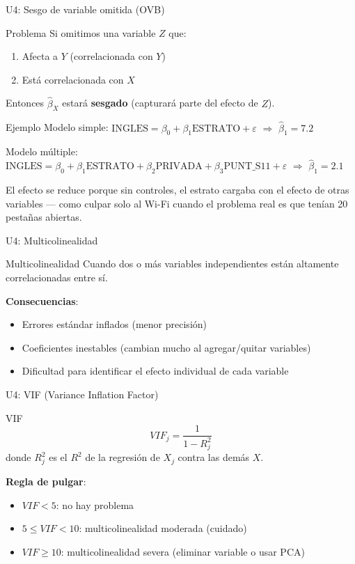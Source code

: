\documentclass[aspectratio=169, 11pt]{beamer}
\begin{document}
\begin{frame}{U4: Sesgo de variable omitida (OVB)}
\begin{alertblock}{Problema}
Si omitimos una variable $Z$ que:
\begin{enumerate}
\item Afecta a $Y$ (correlacionada con $Y$)
\item Está correlacionada con $X$
\end{enumerate}
Entonces $\hat{\beta}_X$ estará \textbf{sesgado} (capturará parte del efecto de $Z$).
\end{alertblock}

\begin{exampleblock}{Ejemplo}
\small
Modelo simple: $\text{INGLES} = \beta_0 + \beta_1 \text{ESTRATO} + \varepsilon$ $\Rightarrow$ $\hat{\beta}_1 = 7.2$

Modelo m\'ultiple: $\text{INGLES} = \beta_0 + \beta_1 \text{ESTRATO} + \beta_2 \text{PRIVADA} + \beta_3 \text{PUNT\_S11} + \varepsilon$ $\Rightarrow$ $\hat{\beta}_1 = 2.1$

El efecto se reduce porque sin controles, el estrato cargaba con el efecto de otras variables --- como culpar solo al Wi-Fi cuando el problema real es que ten\'ian 20 pesta\~nas abiertas.
\end{exampleblock}
\end{frame}

\begin{frame}{U4: Multicolinealidad}
\begin{block}{Multicolinealidad}
Cuando dos o más variables independientes están altamente correlacionadas entre sí.

\textbf{Consecuencias}:
\begin{itemize}
\item Errores estándar inflados (menor precisión)
\item Coeficientes inestables (cambian mucho al agregar/quitar variables)
\item Dificultad para identificar el efecto individual de cada variable
\end{itemize}
\end{block}
\end{frame}

\begin{frame}{U4: VIF (Variance Inflation Factor)}
\begin{block}{VIF}
$$VIF_j = \frac{1}{1 - R_j^2}$$
donde $R_j^2$ es el $R^2$ de la regresión de $X_j$ contra las demás $X$.

\textbf{Regla de pulgar}:
\begin{itemize}
\item $VIF < 5$: no hay problema
\item $5 \leq VIF < 10$: multicolinealidad moderada (cuidado)
\item $VIF \geq 10$: multicolinealidad severa (eliminar variable o usar PCA)
\end{itemize}
\end{block}
\end{frame}
\end{document}
